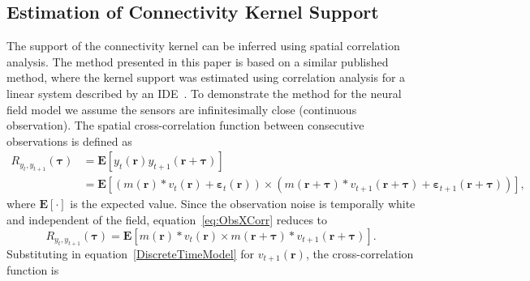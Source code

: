 \documentclass[]{article}
\begin{document}
\subsection{Estimation of Connectivity Kernel Support}
The support of the connectivity kernel can be inferred using spatial correlation analysis. The method presented in this paper is based on a similar published method, where the kernel support was estimated using correlation analysis for a linear system described by an IDE~\cite{Scerri2009}. To demonstrate the method for the neural field model we assume the sensors are infinitesimally close (continuous observation). The spatial cross-correlation function between consecutive observations is defined as 
\begin{align}
	R_{y_{t},y_{t+1}}(\boldsymbol{\tau}) &= \mathbf{E}\left[ y_{t}\left(\mathbf{r}\right) y_{t+1}\left(\mathbf{r}+\boldsymbol{\tau}\right) \right] \\
	&= \mathbf{E}\left[\left(m\left(\mathbf{r}\right) \ast v_t\left(\mathbf{r}\right) + \boldsymbol{\varepsilon}_t\left(\mathbf{r}\right) \right) \times \left( m\left(\mathbf{r}+\boldsymbol{\tau}\right) \ast v_{t+1}\left(\mathbf{r}+\boldsymbol{\tau}\right) + \boldsymbol{\varepsilon}_{t+1}\left(\mathbf{r}+\boldsymbol{\tau}\right)\right) \right], \label{eq:ObsXCorr}
\end{align}
where $\mathbf{E}[\cdot]$ is the expected value. Since the observation noise is temporally white and independent of the field, equation~\ref{eq:ObsXCorr} reduces to
\begin{equation}
	R_{y_{t},y_{t+1}}(\boldsymbol{\tau}) = \mathbf{E}\left[ m\left(\mathbf{r}\right) \ast v_t\left(\mathbf{r}\right) \times m\left(\mathbf{r}+\boldsymbol{\tau}\right) \ast v_{t+1}\left(\mathbf{r}+\boldsymbol{\tau}\right) \right].
\end{equation}
Substituting in equation~\ref{DiscreteTimeModel}  for $v_{t+1}\left(\mathbf{r}\right)$, the cross-correlation function is
\end{document}
